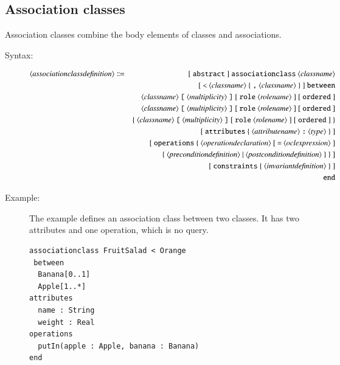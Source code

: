 \documentclass[a4paper,titlepage,oneside,final]{scrreprt} %
\begin{document}
\subsection{Association classes}
Association classes  combine the body elements of classes and associations.
\begin{description}
\item[Syntax:]
\begin{eqnarray*}
\langle\mathit{associationclassdefinition}\rangle &\Coloneqq&
[~\verb+abstract+~]~\verb+associationclass+~
\langle\mathit{classname}\rangle\\
&&[~\verb+<+~\langle\mathit{classname}\rangle~
\{~\verb+,+~\langle\mathit{classname}\rangle~\}~]~\verb+between+\\
&&\langle\mathit{classname}\rangle~\verb+[+~\langle\mathit{multiplicity}\rangle~
\verb+]+~[~\verb+role+~\langle\mathit{rolename}\rangle~]~[~\verb+ordered+~]\\
&&\langle\mathit{classname}\rangle~\verb+[+~\langle\mathit{multiplicity}\rangle~
\verb+]+~[~\verb+role+~\langle\mathit{rolename}\rangle~]~[~\verb+ordered+~]\\
&&\{~\langle\mathit{classname}\rangle~\verb+[+~\langle\mathit{multiplicity}\rangle~
\verb+]+~[~\verb+role+~\langle\mathit{rolename}\rangle~]~[~\verb+ordered+~]~\}\\
&&[~\verb+attributes+~\{~\langle\mathit{attributename}\rangle
~\verb+:+~\langle\mathit{type}\rangle~\}~]\\
&&[~\verb+operations+~\{~\langle\mathit{operationdeclaration}\rangle
~[~\verb+=+~\langle\mathit{oclexpression}\rangle~]\\
&&\{~\langle\mathit{preconditiondefinition}\rangle~|~
\langle\mathit{postconditiondefinition}\rangle~\}~\}~]\\
&& [~\verb+constraints+~\{~\langle\mathit{invariantdefinition}\rangle~\}~]\\
&& \verb+end+
\end{eqnarray*}
\item[Example:] The example defines an association class between
two classes. It has two attributes and one operation, which is no
query.
\begin{verbatim}
associationclass FruitSalad < Orange
 between
  Banana[0..1]
  Apple[1..*]
attributes
  name : String
  weight : Real
operations
  putIn(apple : Apple, banana : Banana)
end
\end{verbatim}
\end{description}
\end{document}
